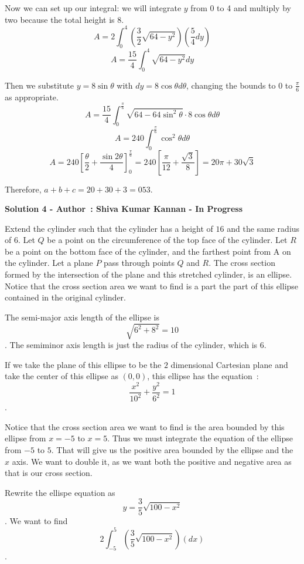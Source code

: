 \begin{enumerate}
 Now we can set up our integral: we will integrate $y$ from 0 to 4 and multiply by two because the total height is 8.
 \[A = 2\int_0^4 \left(\frac{3}{2}\sqrt{ 64 - y^2 }\right) \left( \frac{5}{4} dy\right)\]
 \[A = \frac{15}{4} \int_0^4 \sqrt{ 64 - y^2 }dy\]

 Then we substitute $y = 8\sin \theta$ with $dy = 8 \cos \theta d \theta$, changing the bounds to 0 to $\frac{\pi}{6}$ as appropriate.
 \[A = \frac{15}{4} \int_0^\frac{\pi}{6} \sqrt{ 64 - 64\sin^2 \theta }\cdot 8\cos\theta d\theta\]
 \[A = 240 \int_0^\frac{\pi}{6} \cos^2 \theta d\theta\]
 \[A = 240 \left[ \frac{\theta}{2} + \frac{\sin 2\theta}{4} \right]_0^\frac{\pi}{6}  = 240 \left[ \frac{\pi}{12} + \frac{\sqrt{3}}{8} \right] = 20{\pi} + 30\sqrt{3}\]

 Therefore, $a + b + c = 20 + 30 + 3 = \boxed{053}$.

 


 



\textbf{Solution 4 - Author : Shiva Kumar Kannan - In Progress}

Extend the cylinder such that the cylinder has a height of $16$ and the same radius of $6$. Let $Q$ be a point on the circumference of the top face of the cylinder. Let $R$ be a point on the bottom face of the cylinder, and the farthest point from A on the cylinder. Let a plane $P$ pass through points $Q$ and $R$. The cross section formed by the intersection of the plane and this stretched cylinder, is an ellipse. Notice that the cross section area we want to find is a part the part of this ellipse contained in the original cylinder. 

 
The semi-major axis length of the ellipse is 
 \[\sqrt{6^2 + 8^2} = 10\]. The semiminor axis length is just the radius of the cylinder, which is $6$. 

 
If we take the plane of this ellipse to be the $2$ dimensional Cartesian plane and take the center of this ellipse as $(0, 0)$, this ellipse has the equation : 
 \[\frac{x^2}{10^2} + \frac{y^2}{6^2} = 1\].

 
Notice that the cross section area we want to find is the area bounded by this ellipse from $x = -5$ to $x = 5$. Thus we must integrate the equation of the ellipse from $-5$ to $5$. That will give us the positive area bounded by the ellipse and the $x$ axis. We want to double it, as we want both the positive and negative area as that is our cross section. 

 
Rewrite the ellispe equation as 
 \[y = \frac{3}{5} \sqrt{100 - x^2}\]. We want to find 
 \[2\int_{-5}^{5} \left(\frac{3}{5}\sqrt{100 - x^2 }\right) \left( dx\right)\].


\end{enumerate}
